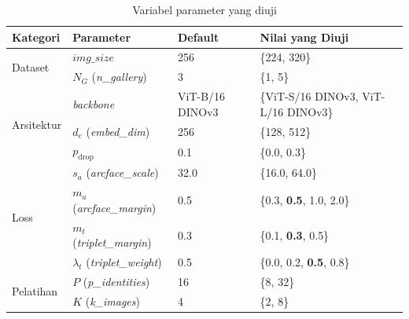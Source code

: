 \begin{table}[htbp]
    \centering
    \caption{Variabel parameter yang diuji}
    \label{tab:params}
    \renewcommand{\arraystretch}{1.3}
    \begin{tabular}{p{2.8cm} p{3.5cm} p{2cm} p{4.5cm}}
        \hline
        \textbf{Kategori} & \textbf{Parameter}                               & \textbf{Default}  & \textbf{Nilai yang Diuji}                \\
        \hline
        \multirow{2}{*}{Dataset}
                          & $\mathit{img\_size}$                             & 256               & \{224, 320\}                             \\
                          & $N_G$ (\textit{n\_gallery})                      & 3                 & \{1, 5\}                                 \\
        \hline
        \multirow{3}{*}{Arsitektur}
                          & \textit{backbone}                                & ViT-B{/}16 DINOv3 & \{ViT-S{/}16 DINOv3, ViT-L{/}16 DINOv3\} \\
                          & $d_e$ (\textit{embed\_dim})                      & 256               & \{128, 512\}                             \\
                          & $p_{\text{drop}}$                                & 0{.}1             & \{0{.}0, 0{.}3\}                         \\
        \hline
        \multirow{4}{*}{Loss}
                          & $s_a$ (\textit{arcface\_scale})                  & 32{.}0            & \{16{.}0, 64{.}0\}                       \\
                          & $m_a$ (\textit{arcface\_margin})                 & 0{.}5             & \{0{.}3, \textbf{0{.}5}, 1{.}0, 2{.}0\}  \\
                          & $m_t$ (\textit{triplet\_margin})                 & 0{.}3             & \{0{.}1, \textbf{0{.}3}, 0{.}5\}         \\
                          & $\lambda_t$ (\textit{triplet\_weight})           & 0{.}5             & \{0{.}0, 0{.}2, \textbf{0{.}5}, 0{.}8\}  \\
        \hline
        \multirow{6}{*}{Pelatihan}
                          & $P$ (\textit{p\_identities})                     & 16                & \{8, 32\}                                \\
                          & $K$ (\textit{k\_images})                         & 4                 & \{2, 8\}                                 \\

\end{tabular}
\end{table}
